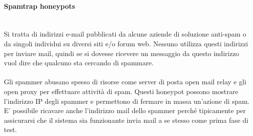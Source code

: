 \documentclass{article}
\begin{document}
\paragraph{Spamtrap honeypots}
\noindent
\\
Si tratta di indirizzi e-mail pubblicati da alcune aziende di soluzione anti-spam o da singoli individui su diversi 
siti e/o forum web. Nessuno utilizza questi indirizzi per inviare mail, quindi se si dovesse ricevere un messaggio 
da questo indirizzo vuol dire che qualcuno sta cercando di spammare.\\\\
Gli spammer abusano spesso di risorse come server di posta open mail relay e gli open proxy per effettuare attività di spam.
Questi honeypot possono mostrare l’indirizzo IP degli spammer e permettono di fermare in massa un’azione di spam. 
E’ possibile ricavare anche l’indirizzo mail dello spammer perché tipicamente per assicurarsi che il sistema sia funzionante 
invia mail a se stesso come prima fase di test.
\end{document}
